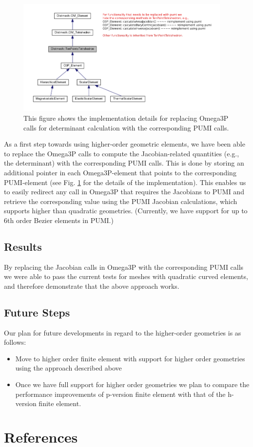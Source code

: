 \documentclass[review,12pt]{elsarticle_summary_report}
\begin{document}
\begin{figure}[!ph]
\centering
\includegraphics[width=0.95\textwidth]{hide_ten_point_tet.png}
\caption{\label{imp} This figure shows the implementation details for replacing Omega3P calls for determinant calculation with the corresponding PUMI calls.}
\end{figure}
As a first step towards using higher-order geometric elements, we have been able to replace the Omega3P calls to compute the Jacobian-related quantities (e.g., the determinant) with the corresponding PUMI calls. This is done by storing an additional pointer in each Omega3P-element that points to the corresponding  PUMI-element (see Fig. \ref{imp} for the details of the implementation).
This enables us to easily redirect any call in Omega3P that requires the Jacobians to PUMI and retrieve the corresponding value using the PUMI Jacobian calculations, which supports higher than quadratic geometries. (Currently, we have support for up to 6th order Bezier elements in PUMI.)

\subsection{Results}
By replacing the Jacobian calls in Omega3P with the corresponding PUMI calls we were able to pass the current tests for meshes with quadratic curved  elements, and therefore demonstrate that the above approach works.

\subsection{\label{high_order_geom_future} Future Steps}
Our plan for future developments in regard to the higher-order geometries is as follows:

\begin{itemize}
  \item Move to higher order finite element with support for higher order geometries using the approach described above
  \item Once we have full support for higher order geometries we plan to compare the performance improvements of p-version finite element with that of the h-version finite element. 
\end{itemize}

\clearpage
\newpage

\section*{References}
% 


\end{document}
